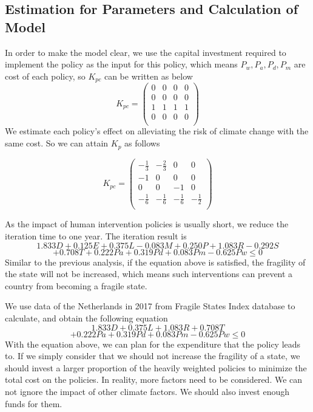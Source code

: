 \documentclass{mcmthesis}
\begin{document}
	\subsection{Estimation for Parameters and Calculation of Model}
	In order to make the model clear, we use the capital investment required to implement the policy as the input for this policy, which means $P_w, P_a, P_d, P_m$ are cost of each policy, so $K_{pc}$ can be written as below
	$$
	K_{pc} = 
	\left(
	\begin{matrix}
		0 & 0 & 0 & 0 \\
		0 & 0 & 0 & 0 \\
		1 & 1 & 1 & 1 \\
		0 & 0 & 0 & 0 \\
	\end{matrix}
	\right)
	$$
	We estimate each policy's effect on alleviating the risk of climate change with the same cost. So we can attain $K_p$ as follows
	\begin{spacing}{1.5}
		$$
		K_{pc}=
		\left(
		\begin{matrix}
		-\frac{1}{3} & -\frac{2}{3} & 0 & 0 \\
		-1 & 0 & 0 & 0 \\
		0 & 0 & -1 & 0 \\
		-\frac{1}{6} & -\frac{1}{6} & -\frac{1}{6} & -\frac{1}{2} \\
		\end{matrix}
		\right)
		$$
	\end{spacing}
	As the impact of human intervention policies is usually short, we reduce the iteration time to one year. The iteration result is
	$$
	1.833D + 0.125E + 0.375L - 0.083M + 0.250P + 1.083R - 0.292S 
	$$
	$$
	 + 0.708T + 0.222Pa + 0.319Pd + 0.083Pm - 0.625Pw \leq 0
	$$
	Similar to the previous analysis, if the equation above is satisfied, the fragility of the state will not be increased, which means such interventions can prevent a country from becoming a fragile state.
	
	We use data of the Netherlands in 2017 from Fragile States Index database to calculate, and obtain the following equation
	$$
	1.833D + 0.375L + 1.083R + 0.708T
	$$
	$$
	 + 0.222Pa + 0.319Pd + 0.083Pm - 0.625Pw \leq 0
	$$
	With the equation above, we can plan for the expenditure that the policy leads to. If we simply consider that we should not increase the fragility of a state, we should invest a larger proportion of the heavily weighted policies to minimize the total cost on the policies. In reality, more factors need to be considered. We can not ignore the impact of other climate factors. We should also invest enough funds for them.
	
\end{document}
